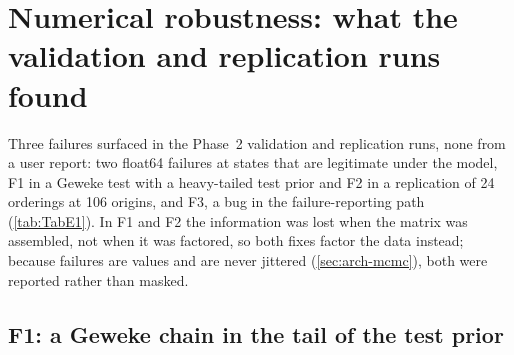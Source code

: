 \section{Numerical robustness: what the validation and replication runs found}\label{sec:robustness}\label{sec:robustness-pattern}


Three failures surfaced in the Phase~2 validation and replication runs, none from a user report: two float64 failures at states that are legitimate under the model, F1 in a Geweke test with a heavy-tailed test prior and F2 in a replication of 24 orderings at 106 origins, and F3, a bug in the failure-reporting path (\cref{tab:TabE1}). %
In F1 and F2 the information was lost when the matrix was assembled, not when it was factored, so both fixes factor the data instead; because failures are values and are never jittered (\cref{sec:arch-mcmc}), both were reported rather than masked. %

\subsection{F1: a Geweke chain in the tail of the test prior}\label{sec:robustness-f1}


